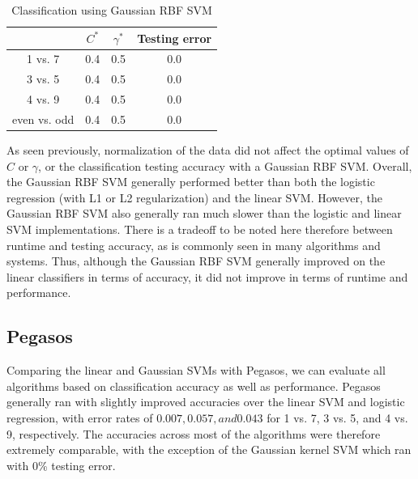 \documentclass{article}
\begin{document}
\begin{table}
  \begin{center}
    \begin{tabular}{ | c | c | c | c | }
      \hline
                     & $C^*$          & $\gamma^*$           & Testing error      \\ \hline
      1 vs. 7        & 0.4            & 0.5                  & 0.0                \\ \hline
      3 vs. 5        & 0.4            & 0.5                  & 0.0                \\ \hline
      4 vs. 9        & 0.4            & 0.5                  & 0.0                \\ \hline
      even vs. odd   & 0.4            & 0.5                  & 0.0                \\ \hline
    \end{tabular}
  \end{center}
  \caption{Classification using Gaussian RBF SVM}
\end{table}

As seen previously, normalization of the data did not affect the optimal values of $C$ or $\gamma$, or the classification testing accuracy with a Gaussian RBF SVM. Overall, the Gaussian RBF SVM generally performed better than both the logistic regression (with L1 or L2 regularization) and the linear SVM. However, the Gaussian RBF SVM also generally ran much slower than the logistic and linear SVM implementations. There is a tradeoff to be noted here therefore between runtime and testing accuracy, as is commonly seen in many algorithms and systems. Thus, although the Gaussian RBF SVM generally improved on the linear classifiers in terms of accuracy, it did not improve in terms of runtime and performance.

\subsection{Pegasos}

Comparing the linear and Gaussian SVMs with Pegasos, we can evaluate all algorithms based on classification accuracy as well as performance. Pegasos generally ran with slightly improved accuracies over the linear SVM and logistic regression, with error rates of $0.007, 0.057, and 0.043$ for 1 vs. 7, 3 vs. 5, and 4 vs. 9, respectively. The accuracies across most of the algorithms were therefore extremely comparable, with the exception of the Gaussian kernel SVM which ran with 0\% testing error. \\
\end{document}
